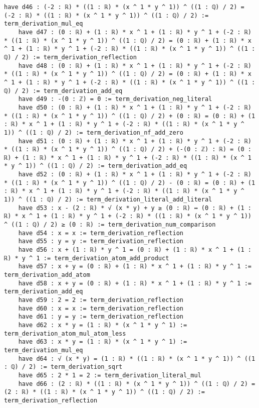 \documentclass{article}
\begin{document}
\begin{tcolorbox}[colback=white!10, width=\linewidth]
\begin{lstlisting}[language=Lean4]
    have d46 : (-2 : ℝ) * ((1 : ℝ) * (x ^ 1 * y ^ 1)) ^ ((1 : ℚ) / 2) = (-2 : ℝ) * ((1 : ℝ) * (x ^ 1 * y ^ 1)) ^ ((1 : ℚ) / 2) := term_derivation_mul_eq
    have d47 : (0 : ℝ) + (1 : ℝ) * x ^ 1 + (1 : ℝ) * y ^ 1 + (-2 : ℝ) * ((1 : ℝ) * (x ^ 1 * y ^ 1)) ^ ((1 : ℚ) / 2) = (0 : ℝ) + (1 : ℝ) * x ^ 1 + (1 : ℝ) * y ^ 1 + (-2 : ℝ) * ((1 : ℝ) * (x ^ 1 * y ^ 1)) ^ ((1 : ℚ) / 2) := term_derivation_reflection
    have d48 : (0 : ℝ) + (1 : ℝ) * x ^ 1 + (1 : ℝ) * y ^ 1 + (-2 : ℝ) * ((1 : ℝ) * (x ^ 1 * y ^ 1)) ^ ((1 : ℚ) / 2) = (0 : ℝ) + (1 : ℝ) * x ^ 1 + (1 : ℝ) * y ^ 1 + (-2 : ℝ) * ((1 : ℝ) * (x ^ 1 * y ^ 1)) ^ ((1 : ℚ) / 2) := term_derivation_add_eq
    have d49 : -(0 : ℤ) = 0 := term_derivation_neg_literal
    have d50 : (0 : ℝ) + (1 : ℝ) * x ^ 1 + (1 : ℝ) * y ^ 1 + (-2 : ℝ) * ((1 : ℝ) * (x ^ 1 * y ^ 1)) ^ ((1 : ℚ) / 2) + (0 : ℝ) = (0 : ℝ) + (1 : ℝ) * x ^ 1 + (1 : ℝ) * y ^ 1 + (-2 : ℝ) * ((1 : ℝ) * (x ^ 1 * y ^ 1)) ^ ((1 : ℚ) / 2) := term_derivation_nf_add_zero
    have d51 : (0 : ℝ) + (1 : ℝ) * x ^ 1 + (1 : ℝ) * y ^ 1 + (-2 : ℝ) * ((1 : ℝ) * (x ^ 1 * y ^ 1)) ^ ((1 : ℚ) / 2) + (-(0 : ℤ) : ℝ) = (0 : ℝ) + (1 : ℝ) * x ^ 1 + (1 : ℝ) * y ^ 1 + (-2 : ℝ) * ((1 : ℝ) * (x ^ 1 * y ^ 1)) ^ ((1 : ℚ) / 2) := term_derivation_add_eq
    have d52 : (0 : ℝ) + (1 : ℝ) * x ^ 1 + (1 : ℝ) * y ^ 1 + (-2 : ℝ) * ((1 : ℝ) * (x ^ 1 * y ^ 1)) ^ ((1 : ℚ) / 2) - (0 : ℝ) = (0 : ℝ) + (1 : ℝ) * x ^ 1 + (1 : ℝ) * y ^ 1 + (-2 : ℝ) * ((1 : ℝ) * (x ^ 1 * y ^ 1)) ^ ((1 : ℚ) / 2) := term_derivation_literal_add_literal
    have d53 : x - (2 : ℝ) * √ (x * y) + y ≥ (0 : ℝ) ↔ (0 : ℝ) + (1 : ℝ) * x ^ 1 + (1 : ℝ) * y ^ 1 + (-2 : ℝ) * ((1 : ℝ) * (x ^ 1 * y ^ 1)) ^ ((1 : ℚ) / 2) ≥ (0 : ℝ) := term_derivation_num_comparison
    have d54 : x = x := term_derivation_reflection
    have d55 : y = y := term_derivation_reflection
    have d56 : x + (1 : ℝ) * y ^ 1 = (0 : ℝ) + (1 : ℝ) * x ^ 1 + (1 : ℝ) * y ^ 1 := term_derivation_atom_add_product
    have d57 : x + y = (0 : ℝ) + (1 : ℝ) * x ^ 1 + (1 : ℝ) * y ^ 1 := term_derivation_add_atom
    have d58 : x + y = (0 : ℝ) + (1 : ℝ) * x ^ 1 + (1 : ℝ) * y ^ 1 := term_derivation_add_eq
    have d59 : 2 = 2 := term_derivation_reflection
    have d60 : x = x := term_derivation_reflection
    have d61 : y = y := term_derivation_reflection
    have d62 : x * y = (1 : ℝ) * (x ^ 1 * y ^ 1) := term_derivation_atom_mul_atom_less
    have d63 : x * y = (1 : ℝ) * (x ^ 1 * y ^ 1) := term_derivation_mul_eq
    have d64 : √ (x * y) = (1 : ℝ) * ((1 : ℝ) * (x ^ 1 * y ^ 1)) ^ ((1 : ℚ) / 2) := term_derivation_sqrt
    have d65 : 2 * 1 = 2 := term_derivation_literal_mul
    have d66 : (2 : ℝ) * ((1 : ℝ) * (x ^ 1 * y ^ 1)) ^ ((1 : ℚ) / 2) = (2 : ℝ) * ((1 : ℝ) * (x ^ 1 * y ^ 1)) ^ ((1 : ℚ) / 2) := term_derivation_reflection

\end{lstlisting}
\end{tcolorbox}
\end{document}
